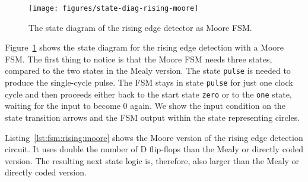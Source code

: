 \documentclass[%
    10pt,
    headinclude, footexclude,
    openright, %
    notitlepage,
    cleardoubleempty,
    headsepline,
    pointlessnumbers,
    bibtotoc, idxtotoc,
    ]{scrbook}
\newcommand{\scale}{0.7}
\newcommand{\code}[1]{{\lstinline[basicstyle=\small\ttfamily]{#1}}}
\begin{document}
\begin{figure}
  \centering
  \texttt{[image: figures/state-diag-rising-moore]}
  \caption{The state diagram of the rising edge detector as Moore FSM.}
  \label{fig:diag:rising:moore}
\end{figure}

%

Figure~\ref{fig:diag:rising:moore} shows the state diagram for the rising
edge detection with a Moore FSM. The first thing to notice is that the Moore FSM
needs three states, compared to the two states in the Mealy version.
The state \code{pulse} is needed to produce the single-cycle pulse.
The FSM stays in state \code{pulse} for just one clock cycle and then
proceeds either back to the start state \code{zero} or to the \code{one}
state, waiting for the input to become 0 again.
We show the input condition on the state transition arrows and the
FSM output within the state representing circles.


Listing~\ref{lst:fsm:rising:moore} shows the Moore version of the rising edge detection
circuit. It uses double the number of D flip-flops than the Mealy or directly
coded version. The resulting next state logic is, therefore, also larger
than the Mealy or directly coded version.
\end{document}
